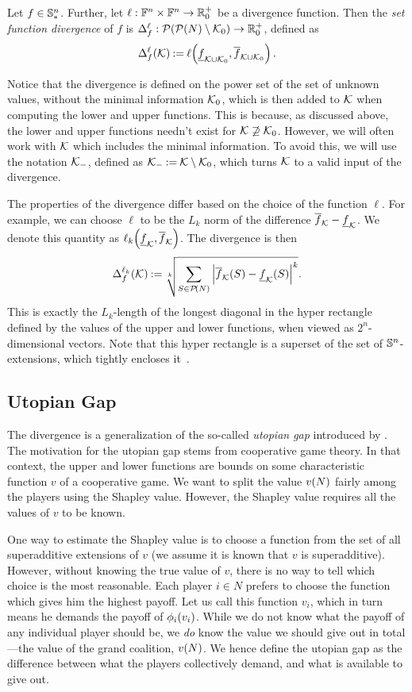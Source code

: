 \begin{defi}[Divergence]
  Let $ f \in \cSp $.
  Further, let $ \ell: \funcs \times \funcs \to \R^+_0 $ be a divergence function.
  Then the \emph{set function divergence} of $  f $ is $ \Delta_f^{\ell}: \pot{\pot N \setminus \k_0} \to \R^+_0 $, defined as \[
    \divg \ell \k \deq \fce{\ell}{\lf[\k \cup \k_0] f, \uf[\k \cup \k_0] f}.
  \]
\end{defi}

Notice that the divergence is defined on the power set of the set of unknown values, without the minimal information $ \k_0 $, which is then added to $ \k $ when computing the lower and upper functions.
This is because, as discussed above, the lower and upper functions needn't exist for $ \k \not\supseteq \k_0 $.
However, we will often work with $ \k $ which includes the minimal information.
To avoid this, we will use the notation $ \k_- $, defined as $ \k_- \deq \k \setminus \k_0 $, which turns $ \k $ to a valid input of the divergence.

The properties of the divergence differ based on the choice of the function $ \ell $.
For example, we can choose $ \ell $ to be the $ L_k $ norm of the difference $ \uf f - \lf f $.
We denote this quantity as $ \fce{\lp k}{\lf f, \uf f} $.
The divergence is then \[
\divg {\lp k} \k \deq \sqrt[k]{\sum_{S \in \pot N}^{} \absolute{ \fce{\uf f}{S} - \fce{\lf f}{S}}^k}.
\]
This is exactly the $ L_k $-length of the longest diagonal in the hyper rectangle defined by the values of the upper and lower functions, when viewed as $ 2^n $-dimensional vectors.
Note that this hyper rectangle is a superset of the set of $ \cSuperadditive $-extensions, which tightly encloses it~\citep{uradnik2024reducing}.

\subsection{Utopian Gap}

The divergence is a generalization of the so-called \emph{utopian gap} introduced by \cite{uradnik2024reducing}.
The motivation for the utopian gap stems from cooperative game theory.
In that context, the upper and lower functions are bounds on some characteristic function $ v $ of a cooperative game.
We want to split the value $ \fce{v}{N} $ fairly among the players using the Shapley value.
However, the Shapley value requires all the values of $ v $ to be known.

One way to estimate the Shapley value is to choose a function from the set of all superadditive extensions of $ v $ (we assume it is known that $ v $ is superadditive).
However, without knowing the true value of $ v $, there is no way to tell which choice is the most reasonable.
Each player $ i \in N $ prefers to choose the function which gives him the highest payoff.
Let us call this function $ v_i $, which in turn means he demands the payoff of $ \shapley[i] {v_i} $.
While we do not know what the payoff of any individual player should be, we \emph{do} know the value we should give out in total---the value of the grand coalition, $ \fce{v}{N} $.
We hence define the utopian gap as the difference between what the players collectively demand, and what is available to give out.

